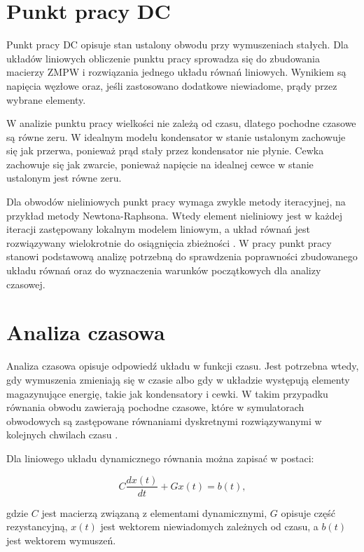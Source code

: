 \section{Punkt pracy DC}
\label{sec:punkt-pracy-dc}

Punkt pracy DC opisuje stan ustalony obwodu przy wymuszeniach stałych. Dla układów liniowych obliczenie punktu pracy sprowadza się do zbudowania macierzy ZMPW i rozwiązania jednego układu równań liniowych. Wynikiem są napięcia węzłowe oraz, jeśli zastosowano dodatkowe niewiadome, prądy przez wybrane elementy.

W analizie punktu pracy wielkości nie zależą od czasu, dlatego pochodne czasowe są równe zeru. W idealnym modelu kondensator w stanie ustalonym zachowuje się jak przerwa, ponieważ prąd stały przez kondensator nie płynie. Cewka zachowuje się jak zwarcie, ponieważ napięcie na idealnej cewce w stanie ustalonym jest równe zeru.

Dla obwodów nieliniowych punkt pracy wymaga zwykle metody iteracyjnej, na przykład metody Newtona-Raphsona. Wtedy element nieliniowy jest w każdej iteracji zastępowany lokalnym modelem liniowym, a układ równań jest rozwiązywany wielokrotnie do osiągnięcia zbieżności \cite{nagel1975spice2,quarteroni2007numerical}. W pracy punkt pracy stanowi podstawową analizę potrzebną do sprawdzenia poprawności zbudowanego układu równań oraz do wyznaczenia warunków początkowych dla analizy czasowej.

\section{Analiza czasowa}
\label{sec:analiza-czasowa}

Analiza czasowa opisuje odpowiedź układu w funkcji czasu. Jest potrzebna wtedy, gdy wymuszenia zmieniają się w czasie albo gdy w układzie występują elementy magazynujące energię, takie jak kondensatory i cewki. W takim przypadku równania obwodu zawierają pochodne czasowe, które w symulatorach obwodowych są zastępowane równaniami dyskretnymi rozwiązywanymi w kolejnych chwilach czasu \cite{nagel1975spice2,kundert1995designer}.

Dla liniowego układu dynamicznego równania można zapisać w postaci:

\begin{equation}
\label{eq:dynamic-system}
C\frac{dx(t)}{dt} + Gx(t) = b(t),
\end{equation}

gdzie \(C\) jest macierzą związaną z elementami dynamicznymi, \(G\) opisuje część rezystancyjną, \(x(t)\) jest wektorem niewiadomych zależnych od czasu, a \(b(t)\) jest wektorem wymuszeń.

